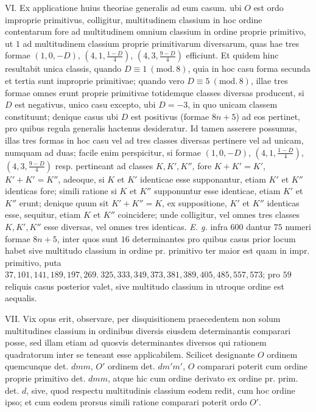 VI. Ex applicatione huius theoriae generalis ad eum casum. ubi \(O\) est ordo improprie primitivus, colligitur, multitudinem classium in hoc ordine contentarum fore ad multitudinem omnium classium in ordine proprie primitivo, ut \(1\) ad multitudinem classium proprie primitivarum diversarum, quas hae tres formae \((1,0,-D)\), \((4,1,\frac{1-D}{4})\), \((4,3,\frac{9-D}{4})\) efficiunt. Et quidem hinc resultabit unica classis, quando \(D\equiv1\ (\mathrm{mod.}\,8)\), quia in hoc casu forma secunda et tertia sunt improprie primitivae; quando vero \(D\equiv5\ (\mathrm{mod.}\,8)\), illae tres formae omnes erunt proprie primitivae totidemque classes diversas producent, si \(D\) est negativus, unico casu excepto, ubi \(D=-3\), in quo unicam classem constituunt; denique casus ubi \(D\) est positivus (formae \(8n+5\)) ad eos pertinet, pro quibus regula generalis hactenus desideratur. Id tamen asserere possumus, illas tres formas in hoc casu
vel ad tres classes diversas pertinere vel ad unicam, numquam ad duas; facile enim perspicitur, si formae \((1,0,-D)\), \((4,1,\frac{1-D}{4})\), \((4,3,\frac{9-D}{4})\) resp. pertineant ad classes \(K,K',K''\), fore \(K+K'=K'\), \(K'+K'=K''\), adeoque, si \(K\) et \(K'\) identicae esse supponantur, etiam \(K'\) et \(K''\) identicas fore; simili ratione si \(K\) et \(K''\) supponuntur esse identicae, etiam \(K'\) et \(K''\) erunt; denique quum sit \(K'+K''=K\), ex suppositione, \(K'\) et \(K''\) identicas esse, sequitur, etiam \(K\) et \(K''\) coincidere; unde colligitur, vel omnes tres classes \(K,K',K''\) esse diversas, vel omnes tres identicas. \textit{E. g.} infra \(600\) dantur \(75\) numeri formae \(8n+5\), inter quos sunt \(16\) determinantes pro quibus casus prior locum habet sive multitudo classium in ordine pr. primitivo ter maior est quam in impr. primitivo, puta \(37,\allowbreak 101,\allowbreak 141,\allowbreak 189,\allowbreak 197,\allowbreak 269.\ 325,\allowbreak 333,\allowbreak 349,\allowbreak 373,\allowbreak 381,\allowbreak 389,\allowbreak 405,\allowbreak 485,\allowbreak 557,\allowbreak 573\); pro \(59\) reliquis casus posterior valet, sive multitudo classium in utroque ordine est aequalis.

VII. Vix opus erit, observare, per disquisitionem praecedentem non solum multitudines classium in ordinibus diversis eiusdem determinantis comparari posse, sed illam etiam ad quosvis determinantes diversos qui rationem quadratorum inter se teneant esse applicabilem. Scilicet designante \(O\) ordinem quemcunque det. \(dmm\), \(O'\) ordinem det. \(dm'm'\), \(O\) comparari poterit cum ordine proprie primitivo det. \(dmm\), atque hic cum ordine derivato ex ordine pr. prim. det. \(d\), sive, quod respectu multitudinis classium eodem redit, cum hoc ordine ipso; et cum eodem prorsus simili ratione comparari poterit ordo \(O'\).

